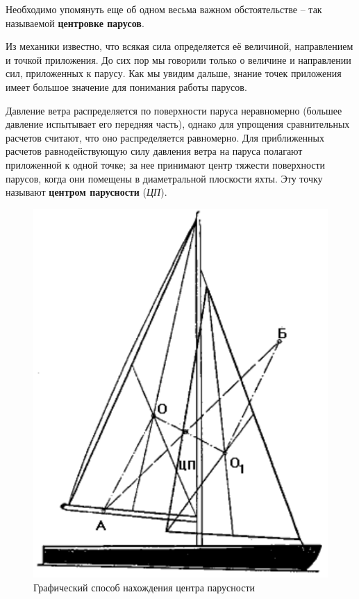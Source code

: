 \documentclass[a4paper, 12pt, twoside, final]{scrbook}
\begin{document}
Необходимо упомянуть еще об одном весьма важном обстоятельстве \--- так называемой \textbf{центровке парусов}.

Из механики известно, что всякая сила определяется её величиной, направлением и точкой приложения. До сих пор мы говорили только о величине и направлении сил, приложенных к парусу. Как мы увидим дальше, знание точек приложения имеет большое значение для понимания работы парусов.

Давление ветра распределяется по поверхности паруса неравномерно (большее давление испытывает его передняя часть), однако для упрощения сравнительных расчетов считают, что оно распределяется равномерно. Для приближенных расчетов равнодействующую силу давления ветра на паруса полагают приложенной к одной точке; за нее принимают центр тяжести поверхности парусов, когда они помещены в диаметральной плоскости яхты. Эту точку называют \textbf{центром парусности} (\textit{ЦП}).

\begin{figure}[htbp]
   \centering
   \includegraphics{98_Graf_sposob_centr_parusn} %
   \caption{Графический способ нахождения центра парусности}
   \label{fig:98}
\end{figure}
\end{document}
